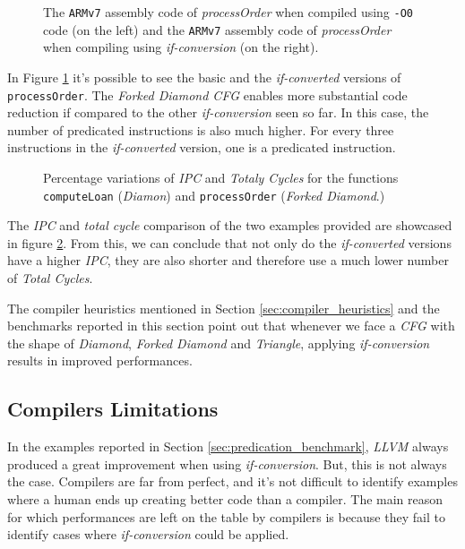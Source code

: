\begin{figure}[H]
    \centering
    
    \caption[\texttt{ARMv7} Assembly Code of \textit{processOrder}]{The \texttt{ARMv7} assembly code of \textit{processOrder} when compiled using \texttt{-O0} code (on the left) and the \texttt{ARMv7} assembly code of \textit{processOrder} when compiling using \textit{if-conversion} (on the right).}
    \label{fig:process_order_asm}
\end{figure}

In Figure \ref{fig:process_order_asm} it's possible to see the basic and the \textit{if-converted} versions of \texttt{processOrder}. The \textit{Forked Diamond CFG} enables more substantial code reduction if compared to the other \textit{if-conversion} seen so far. In this case, the number of predicated instructions is also much higher. For every three instructions in the \textit{if-converted} version, one is a predicated instruction.

\begin{figure}[H]
    \centering
    
    \caption{Percentage variations of \textit{IPC} and \textit{Totaly Cycles} for the functions \texttt{computeLoan} (\textit{Diamon}) and \texttt{processOrder} (\textit{Forked Diamond}.)}
    \label{fig:benchmarks}
\end{figure}

The \textit{IPC} and \textit{total cycle} comparison of the two examples provided are showcased in figure \ref{fig:benchmarks}. From this, we can conclude that not only do the \textit{if-converted} versions have a higher \textit{IPC}, they are also shorter and therefore use a much lower number of \textit{Total Cycles}. 

The compiler heuristics mentioned in Section \ref{sec:compiler_heuristics} and the benchmarks reported in this section point out that whenever we face a \textit{CFG} with the shape of \textit{Diamond}, \textit{Forked Diamond} and \textit{Triangle}, applying \textit{if-conversion} results in improved performances.

\subsection{Compilers Limitations}
\label{sec:limitations}
In the examples reported in Section \ref{sec:predication_benchmark}, \textit{LLVM} always produced a great improvement when using \textit{if-conversion}. But, this is not always the case. Compilers are far from perfect, and it's not difficult to identify examples where a human ends up creating better code than a compiler.
The main reason for which performances are left on the table by compilers is because they fail to identify cases where \textit{if-conversion} could be applied.


